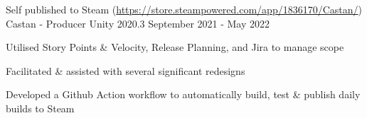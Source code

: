 

\begin{cventries}

    \cventry
    {Self published to Steam (\href{https://store.steampowered.com/app/1836170/Castan/}{https://store.steampowered.com/app/1836170/Castan/})}
    {Castan - Producer}
    {Unity 2020.3}
    {September 2021 - May 2022}
    {
        \begin{cvitems}
            \item Utilised Story Points \& Velocity, Release Planning, and Jira to manage scope
            \item Facilitated \& assisted with several significant redesigns
            \item Developed a Github Action workflow to automatically build, test \& publish daily builds to Steam
        \end{cvitems}  
    }



\end{cventries}
